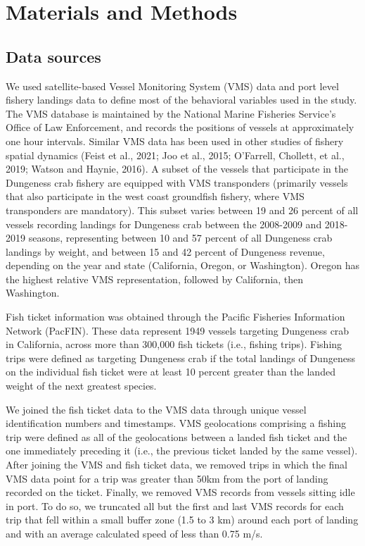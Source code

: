 \documentclass[]{elsarticle} %
\begin{document}
\hypertarget{methods}{%
\section{Materials and Methods}\label{methods}}

\hypertarget{data-sources}{%
\subsection{Data sources}\label{data-sources}}

We used satellite-based Vessel Monitoring System (VMS) data and port
level fishery landings data to define most of the behavioral variables
used in the study. The VMS database is maintained by the National Marine
Fisheries Service's Office of Law Enforcement, and records the positions
of vessels at approximately one hour intervals. Similar VMS data has
been used in other studies of fishery spatial dynamics (Feist et al.,
2021; Joo et al., 2015; O'Farrell, Chollett, et al., 2019; Watson and
Haynie, 2016). A subset of the vessels that participate in the Dungeness
crab fishery are equipped with VMS transponders (primarily vessels that
also participate in the west coast groundfish fishery, where VMS
transponders are mandatory). This subset varies between 19 and 26
percent of all vessels recording landings for Dungeness crab between the
2008-2009 and 2018-2019 seasons, representing between 10 and 57 percent
of all Dungeness crab landings by weight, and between 15 and 42 percent
of Dungeness revenue, depending on the year and state (California,
Oregon, or Washington). Oregon has the highest relative VMS
representation, followed by California, then Washington.

Fish ticket information was obtained through the Pacific Fisheries
Information Network (PacFIN). These data represent 1949 vessels
targeting Dungeness crab in California, across more than 300,000 fish
tickets (i.e., fishing trips). Fishing trips were defined as targeting
Dungeness crab if the total landings of Dungeness on the individual fish
ticket were at least 10 percent greater than the landed weight of the
next greatest species.

We joined the fish ticket data to the VMS data through unique vessel
identification numbers and timestamps. VMS geolocations comprising a
fishing trip were defined as all of the geolocations between a landed
fish ticket and the one immediately preceding it (i.e., the previous
ticket landed by the same vessel). After joining the VMS and fish ticket
data, we removed trips in which the final VMS data point for a trip was
greater than 50km from the port of landing recorded on the ticket.
Finally, we removed VMS records from vessels sitting idle in port. To do
so, we truncated all but the first and last VMS records for each trip
that fell within a small buffer zone (1.5 to 3 km) around each port of
landing and with an average calculated speed of less than 0.75 m/s.
\end{document}
